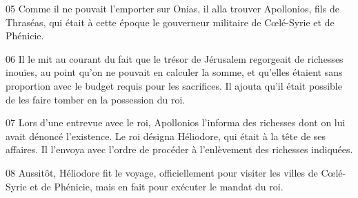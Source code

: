 
05 Comme il ne pouvait l’emporter sur Onias, il alla trouver Apollonios, fils de Thraséas, qui était à cette époque le gouverneur militaire de Cœlé-Syrie et de Phénicie.

06 Il le mit au courant du fait que le trésor de Jérusalem regorgeait de richesses inouïes, au point qu’on ne pouvait en calculer la somme, et qu’elles étaient sans proportion avec le budget requis pour les sacrifices. Il ajouta qu’il était possible de les faire tomber en la possession du roi.

07 Lors d’une entrevue avec le roi, Apollonios l’informa des richesses dont on lui avait dénoncé l’existence. Le roi désigna Héliodore, qui était à la tête de ses affaires. Il l’envoya avec l’ordre de procéder à l’enlèvement des richesses indiquées.

08 Aussitôt, Héliodore fit le voyage, officiellement pour visiter les villes de Cœlé-Syrie et de Phénicie, mais en fait pour exécuter le mandat du roi.
